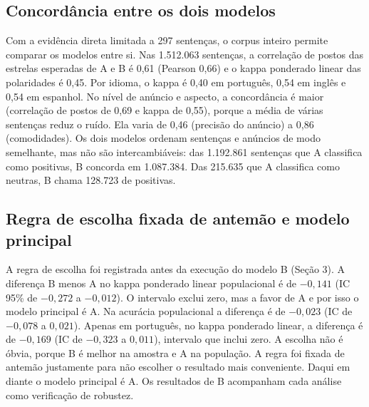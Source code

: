 \begin{table}[htb]
\centering
\caption{Precisão da atribuição de aspecto, por aspecto previsto (27 sentenças rotuladas em cada).}
\small
{}
\label{tab:precisao}
\end{table}

\subsection{Concordância entre os dois modelos}

Com a evidência direta limitada a 297 sentenças, o corpus inteiro permite comparar os modelos entre si. Nas 1.512.063 sentenças, a correlação de postos das estrelas esperadas de A e B é 0,61 (Pearson 0,66) e o kappa ponderado linear das polaridades é 0,45. Por idioma, o kappa é 0,40 em português, 0,54 em inglês e 0,54 em espanhol. No nível de anúncio e aspecto, a concordância é maior (correlação de postos de 0,69 e kappa de 0,55), porque a média de várias sentenças reduz o ruído. Ela varia de 0,46 (precisão do anúncio) a 0,86 (comodidades). Os dois modelos ordenam sentenças e anúncios de modo semelhante, mas não são intercambiáveis: das 1.192.861 sentenças que A classifica como positivas, B concorda em 1.087.384. Das 215.635 que A classifica como neutras, B chama 128.723 de positivas.

\subsection{Regra de escolha fixada de antemão e modelo principal}

A regra de escolha foi registrada antes da execução do modelo B (Seção 3). A diferença B menos A no kappa ponderado linear populacional é de $-0{,}141$ (IC 95\% de $-0{,}272$ a $-0{,}012$). O intervalo exclui zero, mas a favor de A e por isso o modelo principal é A. Na acurácia populacional a diferença é de $-0{,}023$ (IC de $-0{,}078$ a $0{,}021$). Apenas em português, no kappa ponderado linear, a diferença é de $-0{,}169$ (IC de $-0{,}323$ a $0{,}011$), intervalo que inclui zero. A escolha não é óbvia, porque B é melhor na amostra e A na população. A regra foi fixada de antemão justamente para não escolher o resultado mais conveniente. Daqui em diante o modelo principal é A. Os resultados de B acompanham cada análise como verificação de robustez.

